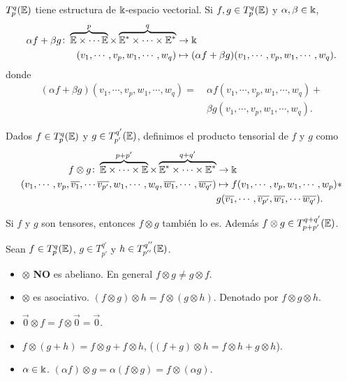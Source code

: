 \begin{prop}
    $T_p^q(\mathbb{E})$ tiene estructura de $\Bbbk$-espacio vectorial. Si $f, g \in T_p^q(\mathbb{E})$ y
    $\alpha , \beta \in \Bbbk$,
    \[
        \begin{aligned}
            \alpha f + \beta g \colon \overbrace{\mathbb{E} \times \cdots \mathbb{E}}^p \times
            \overbrace{\mathbb{E}^* \times \cdots \times \mathbb{E}^*}^q &\to \Bbbk \\
            (v_1, \cdots, v_p, w_1, \cdots, w_q) &\mapsto (\alpha f + \beta g)
            (v_1, \cdots, v_p, w_1, \cdots, w_q).
        \end{aligned}
    \]
    donde
    \[
    \begin{aligned}
    (\alpha f + \beta g) (v_1, \cdots, v_p, w_1, \cdots, w_q) = \
    &\alpha f(v_1, \cdots, v_p, w_1, \cdots, w_q) + \\
    &\beta g(v_1, \cdots, v_p, w_1, \cdots, w_q).
    \end{aligned}
    \]
\end{prop}
\begin{defi}
    Dados $f \in T_p^q(\mathbb{E})$ y $g \in T_{p'}^{q'}(\mathbb{E})$, definimos el producto
    tensorial de $f$ y $g$ como
    \[
        \begin{aligned}
            f \otimes g \colon \overbrace{\mathbb{E} \times \cdots \times \mathbb{E}}^{p+p'}
            \times \overbrace{\mathbb{E}^* \times \cdots \times \mathbb{E}^*}^{q+q'} &\to \Bbbk \\
            (v_1, \cdots, v_p, \overline{v_1}, \cdots \overline{v_{p'}},
            w_1, \cdots, w_q, \overline{w_1}, \cdots, \overline{w_{q'}})
            &\mapsto f(v_1, \cdots, v_p, w_1, \cdots, w_p) * \\
            &g(\overline{v_1}, \cdots, \overline{v_{p'}}, \overline{w_1}, \cdots
            \overline{w_{q'}}).
        \end{aligned}
    \]
\end{defi}
\begin{obs}
    Si $f$ y $g$ son tensores, entonces $f \otimes g$ también lo es. Además
    $f \otimes g \in T_{p+p'}^{q+q'}(\mathbb{E})$.
\end{obs}
\begin{prop}
    Sean  $f \in T_p^q(\mathbb{E})$, $g \in T_{p'}^{q'}$ y $h \in T_{p''}^{q''}(\mathbb{E})$.
    \begin{itemize}
        \item $\otimes$ {\bfseries NO} es abeliano. En general $f \otimes g \neq
        g \otimes f$.
        \item $\otimes$ es asociativo. $(f \otimes g) \otimes h = f \otimes (g
        \otimes h)$. Denotado por $f \otimes g \otimes h$.
        \item $\vec{0} \otimes f = f \otimes \vec{0} = \vec{0}$.
        \item $f \otimes (g + h) = f \otimes g + f\otimes h$, \quad ($(f+g) \otimes
        h = f \otimes h + g \otimes h$).
        \item $\alpha \in \Bbbk$. $(\alpha f) \otimes g = \alpha(f \otimes g) =
        f \otimes (\alpha g)$.
    \end{itemize}
\end{prop}
